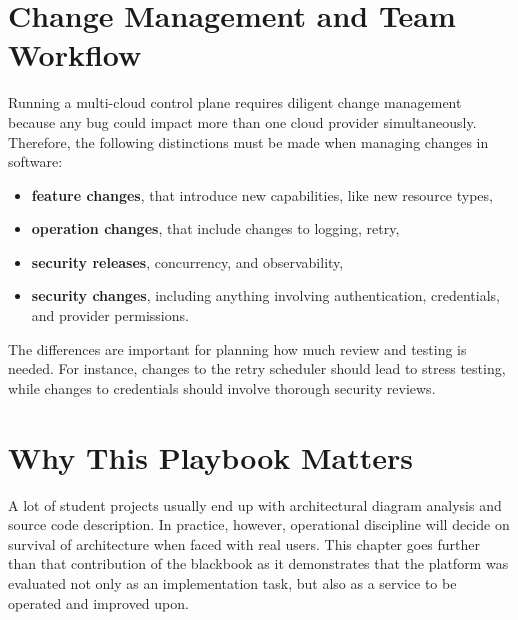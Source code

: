 \section{Change Management and Team Workflow}
Running a multi-cloud control plane requires diligent change management because any bug could impact more than one cloud provider simultaneously. Therefore, the following distinctions must be made when managing changes in software:

\begin{itemize}
    \item \textbf{feature changes}, that introduce new capabilities, like new resource types,
    \item \textbf{operation changes}, that include changes to logging, retry,
    \item \textbf{security releases}, concurrency, and observability,
    \item \textbf{security changes}, including anything involving authentication, credentials, and provider permissions.
\end{itemize}

The differences are important for planning how much review and testing is needed. For instance, changes to the retry scheduler should lead to stress testing, while changes to credentials should involve thorough security reviews.

\section{Why This Playbook Matters}
A lot of student projects usually end up with architectural diagram analysis and source code description. In practice, however, operational discipline will decide on survival of architecture when faced with real users. This chapter goes further than that contribution of the blackbook as it demonstrates that the platform was evaluated not only as an implementation task, but also as a service to be operated and improved upon. 

\newpage

